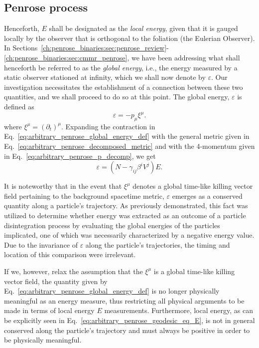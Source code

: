 \subsection{Penrose process}

Henceforth, $E$ shall be designated as the \emph{local energy}, given that it is gauged locally by the observer that is orthogonal to the foliation (the Eulerian Observer). In Sections~\ref{ch:penrose_binaries:sec:penrose_review}-\ref{ch:penrose_binaries:sec:cmmr_penrose}, we have been addressing what shall henceforth be referred to as the \emph{global energy}, i.e., the energy measured by a static observer stationed at infinity, which we shall now denote by $\varepsilon$. Our investigation necessitates the establishment of a connection between these two quantities, and we shall proceed to do so at this point. The global energy, $\varepsilon$ is defined as
%
\begin{equation}
  \varepsilon = - p_\mu \xi^\mu.
  \label{eq:arbitrary_penrose_global_energy_def}
\end{equation}
%
where $\xi^\mu = (\partial_t)^\mu$.
%
Expanding the contraction in Eq.~\eqref{eq:arbitrary_penrose_global_energy_def} with the general metric given in Eq.~\eqref{eq:arbitrary_penrose_decomposed_metric} and with the 4-momentum given in Eq.~\eqref{eq:arbitrary_penrose_p_decomp}, we get
%
\begin{equation}
  \varepsilon = \left( N - \gamma_{ij} \beta^i V^j \right) E.
  \label{eq:arbitrary_penrose_local_global_energy_relation}
\end{equation}

It is noteworthy that in the event that $\xi^\mu$ denotes a global time-like killing vector field pertaining to the background spacetime metric, $\varepsilon$ emerges as a conserved quantity along a particle's trajectory. As previously demonstrated, this fact was utilized to determine whether energy was extracted as an outcome of a particle disintegration process by evaluating the global energies of the particles implicated, one of which was necessarily characterized by a negative energy value. Due to the invariance of $\varepsilon$ along the particle's trajectories, the timing and location of this comparison were irrelevant.

If we, however, relax the assumption that the $\xi^\mu$ is a global time-like killing vector field, the quantity given by Eq.~\eqref{eq:arbitrary_penrose_global_energy_def} is no longer physically meaningful as an energy measure, thus restricting all physical arguments to be made in terms of local energy $E$ measurements. Furthermore, local energy, as can be explicitly seen in Eq.~\eqref{eq:arbitrary_penrose_geodesic_eq_E}, is not in general conserved along the particle's trajectory and must always be positive in order to be physically meaningful.


